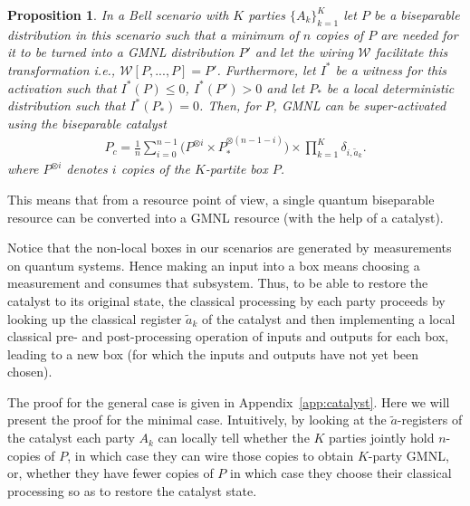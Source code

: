\documentclass[pra,aps,reprint,superscriptaddress]{revtex4-2}
\theoremstyle{theorem}
\newtheorem{prop}{Proposition}[section]
\begin{document}
\begin{prop} \label{prop2}
   In a Bell scenario with $K$ parties $\{A_k\}_{k=1}^{K}$ let $P$ be a biseparable distribution in this scenario such that a minimum of $n$ copies of $P$ are needed for it to be turned into a GMNL distribution $P'$ and let the wiring $\mathcal{W}$ facilitate this transformation i.e., $\mathcal{W}[P,...,P]=P'$. Furthermore, let $I^*$ be a witness for this activation such that $I^*(P)\leq 0$, $I^*(P')>0$ and let $P_{*}$ be a local deterministic distribution such that $I^*(P_*)=0$. Then, for $P$, GMNL can be super-activated using the  biseparable catalyst 
\begin{align}\label{catalyst}
    P_c=\frac{1}{n}\sum_{i=0}^{n-1}\Big(P^{\otimes i}\times P_{*}^{\otimes(n-1-i)}\Big)\times\prod_{k=1}^K \delta_{i,\tilde a_k}.
\end{align}
 where $P^{\otimes i}$ denotes $i$ copies of the $K$-partite box $P$.
\end{prop}
 This means that from a resource point of view, a single quantum biseparable resource can be converted into a GMNL resource (with the help of a catalyst).

Notice that the non-local boxes in our scenarios are generated by measurements on quantum systems. Hence making an input into a box means choosing a measurement and consumes that subsystem. Thus, to be able to restore the catalyst to its original state, the classical processing by each party proceeds by looking up the classical register $\tilde{a}_k$ of the catalyst and then implementing a local classical pre- and post-processing operation of inputs and outputs for each box, leading to a new box (for which the inputs and outputs have not yet been chosen).

The proof for the general case is given in Appendix~\ref{app:catalyst}. Here we will present the proof for the minimal case. Intuitively, by looking at the $\tilde{a}$-registers of the catalyst each party ${A}_k$ can locally tell whether the $K$ parties jointly hold $n$-copies of $P$, in which case they can wire those copies to obtain $K$-party GMNL, or, whether they have fewer copies of $P$ in which case they choose their classical processing so as to restore the catalyst state.  
\end{document}
